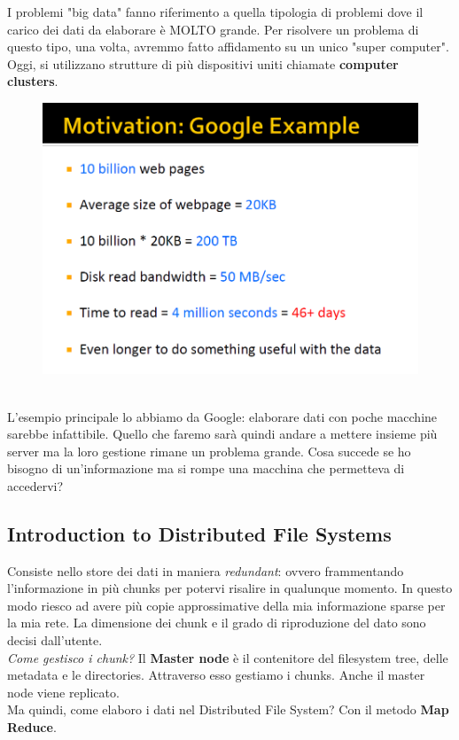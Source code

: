 I problemi "big data" fanno riferimento a quella tipologia di problemi dove il carico dei dati da elaborare è MOLTO grande. Per risolvere un problema di questo tipo, una volta, avremmo fatto affidamento su un unico "super computer". Oggi, si utilizzano strutture di più dispositivi uniti chiamate \textbf{computer clusters}.
\\
\begin{figure}[th]
    \centering
    \includegraphics[scale=0.35]{MapReduce/img/GoogleExample.png}
    \label{fig:googleex}
\end{figure}
\\
L'esempio principale lo abbiamo da Google: elaborare dati con poche macchine sarebbe infattibile. Quello che faremo sarà quindi andare a mettere insieme più server ma la loro gestione rimane un problema grande. Cosa succede se ho bisogno di un'informazione ma si rompe una macchina che permetteva di accedervi? 
\subsection{Introduction to Distributed File Systems}
Consiste nello store dei dati in maniera \textit{redundant}: ovvero frammentando l'informazione in più chunks per potervi risalire in qualunque momento. In questo modo riesco ad avere più copie approssimative della mia informazione sparse per la mia rete. La dimensione dei chunk e il grado di riproduzione del dato sono decisi dall'utente. 
\\
\textit{Come gestisco i chunk?} Il \textbf{Master node} è il contenitore del filesystem tree, delle metadata e le directories. Attraverso esso gestiamo i chunks. Anche il master node viene replicato. 
\\
Ma quindi, come elaboro i dati nel Distributed File System? Con il metodo \textbf{Map Reduce}.
\newpage

